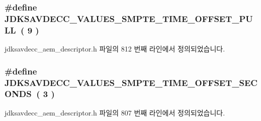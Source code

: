 \subsubsection[{\texorpdfstring{J\+D\+K\+S\+A\+V\+D\+E\+C\+C\+\_\+\+V\+A\+L\+U\+E\+S\+\_\+\+S\+M\+P\+T\+E\+\_\+\+T\+I\+M\+E\+\_\+\+O\+F\+F\+S\+E\+T\+\_\+\+P\+U\+LL}{JDKSAVDECC_VALUES_SMPTE_TIME_OFFSET_PULL}}]{\setlength{\rightskip}{0pt plus 5cm}\#define J\+D\+K\+S\+A\+V\+D\+E\+C\+C\+\_\+\+V\+A\+L\+U\+E\+S\+\_\+\+S\+M\+P\+T\+E\+\_\+\+T\+I\+M\+E\+\_\+\+O\+F\+F\+S\+E\+T\+\_\+\+P\+U\+LL~( 9 )}\hypertarget{group__values__smpte__time_ga058ad33b1ebfa0fdf51707a7bc324626}{}\label{group__values__smpte__time_ga058ad33b1ebfa0fdf51707a7bc324626}


jdksavdecc\+\_\+aem\+\_\+descriptor.\+h 파일의 812 번째 라인에서 정의되었습니다.

\subsubsection[{\texorpdfstring{J\+D\+K\+S\+A\+V\+D\+E\+C\+C\+\_\+\+V\+A\+L\+U\+E\+S\+\_\+\+S\+M\+P\+T\+E\+\_\+\+T\+I\+M\+E\+\_\+\+O\+F\+F\+S\+E\+T\+\_\+\+S\+E\+C\+O\+N\+DS}{JDKSAVDECC_VALUES_SMPTE_TIME_OFFSET_SECONDS}}]{\setlength{\rightskip}{0pt plus 5cm}\#define J\+D\+K\+S\+A\+V\+D\+E\+C\+C\+\_\+\+V\+A\+L\+U\+E\+S\+\_\+\+S\+M\+P\+T\+E\+\_\+\+T\+I\+M\+E\+\_\+\+O\+F\+F\+S\+E\+T\+\_\+\+S\+E\+C\+O\+N\+DS~( 3 )}\hypertarget{group__values__smpte__time_ga96b2d4b7d5276cdb5988546f9c2937f5}{}\label{group__values__smpte__time_ga96b2d4b7d5276cdb5988546f9c2937f5}


jdksavdecc\+\_\+aem\+\_\+descriptor.\+h 파일의 807 번째 라인에서 정의되었습니다.

